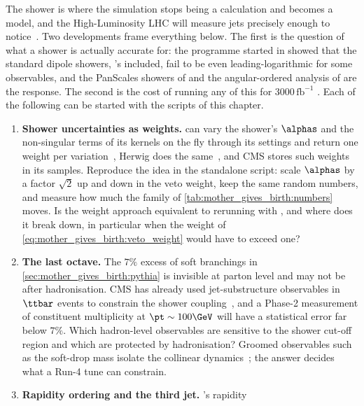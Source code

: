 The shower is where the simulation stops being a calculation and becomes a
model, and the High-Luminosity LHC will measure jets precisely enough to
notice~\cite{Azzi:2019yne}. Two developments frame everything below. The
first is the question of what a shower is actually accurate for: the
programme started in \cite{Dasgupta:2018nvj} showed that the standard
dipole showers, \PYTHIA's included, fail to be even leading-logarithmic
for some observables, and the PanScales showers of
\cite{Dasgupta:2020fwr,Hamilton:2020rcu,vanBeekveld:2022zhl,vanBeekveld:2023chs}
and the angular-ordered analysis of \cite{Bewick:2019rbu} are the response.
The second is the cost of running any of this for $3000\,\mathrm{fb}^{-1}$
\cite{HSFPhysicsEventGeneratorWG:2020gxw}. Each of the following can be
started with the scripts of this chapter.
\begin{enumerate}
  \item \textbf{Shower uncertainties as weights.} \PYTHIA can vary the
    shower's $\alphas$ and the non-singular terms of its kernels on the fly
    through its  settings and return one weight per
    variation~\cite{Mrenna:2016sih}, Herwig does the
    same~\cite{Bellm:2016rhh}, and CMS stores such weights in its samples.
    Reproduce the idea in the standalone script: scale $\alphas$ by a factor
    $\sqrt2$ up and down in the veto weight, keep the same random numbers,
    and measure how much the family \pt of
    \cref{tab:mother_gives_birth:numbers} moves. Is the weight approach
    equivalent to rerunning with , and where does it break
    down, in particular when the weight of \cref{eq:mother_gives_birth:veto_weight}
    would have to exceed one?
  \item \textbf{The last octave.} The $7\%$ excess of soft branchings in
    \cref{sec:mother_gives_birth:pythia} is invisible at parton level and
    may not be after hadronisation. CMS has already used jet-substructure
    observables in $\ttbar$ events to constrain the shower
    coupling~\cite{CMS:2018ypj}, and a Phase-2 measurement of constituent
    multiplicity at $\pt\sim100\GeV$ will have a statistical error far
    below $7\%$. Which hadron-level observables are sensitive to the shower
    cut-off region and which are protected by hadronisation? Groomed
    observables such as the soft-drop mass isolate the collinear
    dynamics~\cite{Anderle:2020mxj}; the answer decides what a Run-4 tune
    can constrain.
  \item \textbf{Rapidity ordering and the third jet.} \PYTHIA's rapidity

\end{enumerate}
